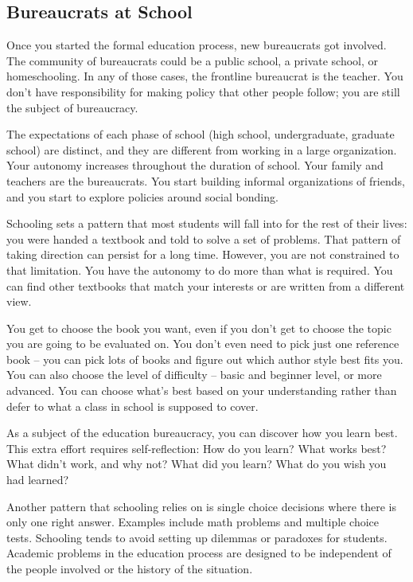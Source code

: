 \subsection*{Bureaucrats at School\label{sec:bureaucracy-of-school}}
Once you started the formal education process, new bureaucrats got involved.  The community of bureaucrats could be a public school, a private school, or homeschooling. In any of those cases, the frontline bureaucrat is the teacher. You don't have responsibility for making policy that other people follow; you are still the subject of bureaucracy.


The expectations of each phase of school (high school, undergraduate, graduate school) are distinct, and they are different from working in a large organization. Your autonomy increases throughout the duration of school. %
Your family and teachers are the bureaucrats. You start building informal organizations of friends, and you start to explore policies around social bonding.

Schooling sets a pattern that most students will fall into for the rest of their lives: you were handed a textbook and told to solve a set of problems. That pattern of taking direction can persist for a long time. However, you are not constrained to that limitation. You have the autonomy to do more than what is required. You can find other textbooks that match your interests or are written from a different view. 

You get to choose the book you want, even if you don't get to choose the topic you are going to be evaluated on. You don't even need to pick just one reference book -- you can pick lots of books and figure out which author style best fits you. You can also choose the level of difficulty -- basic and beginner level, or more advanced. You can choose what's best based on your understanding rather than defer to what a class in school is supposed to cover.

As a subject of the education bureaucracy, you can discover how you learn best. This extra effort requires self-reflection: How do you learn? What works best? What didn't work, and why not? What did you learn? What do you wish you had learned?

Another pattern that schooling relies on is single choice decisions where there is only one right answer. Examples include math problems and multiple choice tests. Schooling tends to avoid setting up dilemmas or paradoxes for students. Academic problems in the education process are designed to be independent of the people involved or the history of the situation. 


